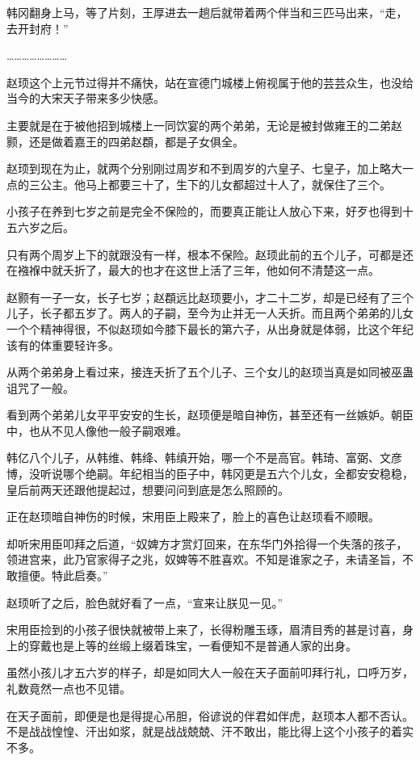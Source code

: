 韩冈翻身上马，等了片刻，王厚进去一趟后就带着两个伴当和三匹马出来，“走，去开封府！”

……………………

赵顼这个上元节过得并不痛快，站在宣德门城楼上俯视属于他的芸芸众生，也没给当今的大宋天子带来多少快感。

主要就是在于被他招到城楼上一同饮宴的两个弟弟，无论是被封做雍王的二弟赵颢，还是做着嘉王的四弟赵頵，都是子女俱全。

赵顼到现在为止，就两个分别刚过周岁和不到周岁的六皇子、七皇子，加上略大一点的三公主。他马上都要三十了，生下的儿女都超过十人了，就保住了三个。

小孩子在养到七岁之前是完全不保险的，而要真正能让人放心下来，好歹也得到十五六岁之后。

只有两个周岁上下的就跟没有一样，根本不保险。赵顼此前的五个儿子，可都是还在襁褓中就夭折了，最大的也才在这世上活了三年，他如何不清楚这一点。

赵颢有一子一女，长子七岁；赵頵远比赵顼要小，才二十二岁，却是已经有了三个儿子，长子都五岁了。两人的子嗣，至今为止并无一人夭折。而且两个弟弟的儿女一个个精神得很，不似赵顼如今膝下最长的第六子，从出身就是体弱，比这个年纪该有的体重要轻许多。

从两个弟弟身上看过来，接连夭折了五个儿子、三个女儿的赵顼当真是如同被巫蛊诅咒了一般。

看到两个弟弟儿女平平安安的生长，赵顼便是暗自神伤，甚至还有一丝嫉妒。朝臣中，也从不见人像他一般子嗣艰难。

韩亿八个儿子，从韩维、韩绛、韩缜开始，哪一个不是高官。韩琦、富弼、文彦博，没听说哪个绝嗣。年纪相当的臣子中，韩冈更是五六个儿女，全都安安稳稳，皇后前两天还跟他提起过，想要问问到底是怎么照顾的。

正在赵顼暗自神伤的时候，宋用臣上殿来了，脸上的喜色让赵顼看不顺眼。

却听宋用臣叩拜之后道，“奴婢方才赏灯回来，在东华门外拾得一个失落的孩子，领进宫来，此乃官家得子之兆，奴婢等不胜喜欢。不知是谁家之子，未请圣旨，不敢擅便。特此启奏。”

赵顼听了之后，脸色就好看了一点，“宣来让朕见一见。”

宋用臣捡到的小孩子很快就被带上来了，长得粉雕玉琢，眉清目秀的甚是讨喜，身上的穿戴也是上等的丝缎上缀着珠宝，一看便知不是普通人家的出身。

虽然小孩儿才五六岁的样子，却是如同大人一般在天子面前叩拜行礼，口呼万岁，礼数竟然一点也不见错。

在天子面前，即便是也是得提心吊胆，俗谚说的伴君如伴虎，赵顼本人都不否认。不是战战惶惶、汗出如浆，就是战战兢兢、汗不敢出，能比得上这个小孩子的着实不多。

